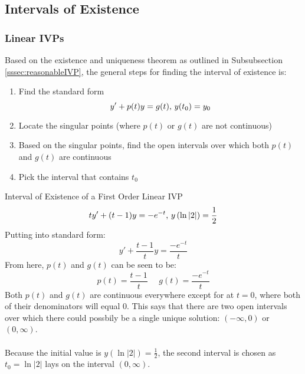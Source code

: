\documentclass[12pt]{article}
\begin{document}
\subsection{Intervals of Existence}
\label{ssec:intervalsOfExistence}

\subsubsection{Linear IVPs}
\label{sssec:linearIVPs}

Based on the existence and uniqueness theorem as outlined in Subsubsection \ref{sssec:reasonableIVP}, the general steps for finding the interval of existence is:
\begin{enumerate}
  \itemsep0em
  \item Find the standard form
    \begin{equation*}
      y'+p(t)y = g(t)\textup{,}\ y(t_0) = y_0
    \end{equation*}
  \item Locate the singular points (where $p(t)$ or $g(t)$ are not continuous)
  \item Based on the singular points, find the open intervals over which both $p(t)$ and $g(t)$ are continuous
  \item Pick the interval that contains $t_0$
\end{enumerate}

\begin{example}{Interval of Existence of a First Order Linear IVP}
  \begin{equation*}
    ty'+(t-1)y = -e^{-t}\textup{,}\ y\left(\ln|2|\right) = \frac{1}{2}
  \end{equation*}
  Putting into standard form:
  \begin{equation*}
    y'+ \frac{t-1}{t}y = \frac{-e^{-t}}{t}
  \end{equation*}
  From here, $p(t)$ and $g(t)$ can be seen to be:
  \begin{equation*}
    p(t) = \frac{t-1}{t}\ \ \ \ \ \ g(t) = \frac{-e^{-t}}{t}
  \end{equation*}
  Both $p(t)$ and $g(t)$ are continuous everywhere except for at $t=0$, where both of their denominators will equal $0$. This says that there are two open intervals over which there could possbily be a single unique solution: $(-\infty,0)$ or $(0,\infty)$.
\\ \\
  Because the initial value is $y\left(\ln|2|\right) = \frac{1}{2}$, the second interval is chosen as $t_0=\ln|2|$ lays on the interval $(0,\infty)$.
\end{example}
\end{document}
